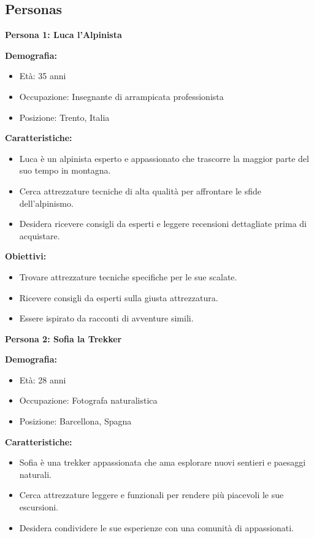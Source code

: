 \subsection{Personas}

\textbf{Persona 1: Luca l'Alpinista}

\textbf{Demografia:}
\begin{itemize}
    \item Età: 35 anni
    \item Occupazione: Insegnante di arrampicata professionista
    \item Posizione: Trento, Italia
\end{itemize}

\textbf{Caratteristiche:}
\begin{itemize}
    \item Luca è un alpinista esperto e appassionato che trascorre la maggior parte del suo tempo in montagna.
    \item Cerca attrezzature tecniche di alta qualità per affrontare le sfide dell'alpinismo.
    \item Desidera ricevere consigli da esperti e leggere recensioni dettagliate prima di acquistare.
\end{itemize}

\textbf{Obiettivi:}
\begin{itemize}
    \item Trovare attrezzature tecniche specifiche per le sue scalate.
    \item Ricevere consigli da esperti sulla giusta attrezzatura.
    \item Essere ispirato da racconti di avventure simili.

\end{itemize}

\textbf{Persona 2: Sofia la Trekker}

\textbf{Demografia:}
\begin{itemize}
    \item Età: 28 anni
    \item Occupazione: Fotografa naturalistica
    \item Posizione: Barcellona, Spagna
\end{itemize}

\textbf{Caratteristiche:}
\begin{itemize}
    \item Sofia è una trekker appassionata che ama esplorare nuovi sentieri e paesaggi naturali.
    \item Cerca attrezzature leggere e funzionali per rendere più piacevoli le sue escursioni.
    \item Desidera condividere le sue esperienze con una comunità di appassionati.
\end{itemize}

